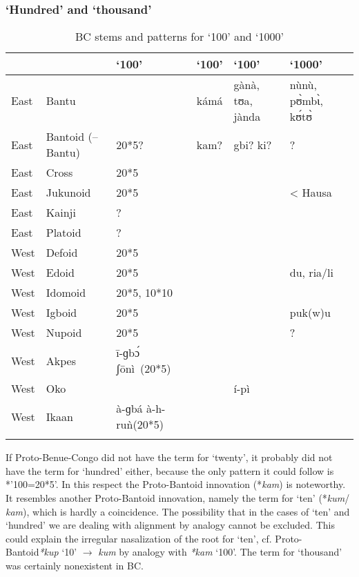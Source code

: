 \clearpage
\subsubsection{‘Hundred’ and ‘thousand’}\label{sec:3.1.4.10}
\begin{table}
\caption{\label{tab:3:63}BC stems and patterns for `100'  and `1000'}


\begin{tabularx}{\textwidth}{lQ QllQ}
\lsptoprule

~ & \textbf{~} & `100' & `100' & `100' & `1000' \\
\midrule
East & {Bantu} &   & kámá & gànà, tʊa, jànda & n{\`{u}}n{\`{u}}, p{\`{ʊ}}mb{\`{ɩ}}, k{\'{ʊ}}t{\`{ʊ}}\\
East & {Bantoid} {(–Bantu)} & 20*5? & kam? & gbi? ki? &?\\
East & {Cross} & 20*5 &   &   &  \\
East & {Jukunoid} & 20*5 &   &   & < Hausa\\
East & {Kainji} & ? &   &   &  \\
East & {Platoid} & ? &   &   &  \\
West & {Defoid} & 20*5 &   &   &  \\
West & {Edoid} & 20*5 &   &   & du, ria/li\\
West & {Idomoid} & 20*5, 10*10 &   &   &  \\
West & {Igboid} & 20*5 &   &   & puk(w)u\\
West & {Nupoid} & 20*5 &   &   & ?\\
West & {Akpes} & {\={i}}-ɡb{\'{ɔ}} ʃ{\={o}}nì~(20*5) &   &   &  \\
West & {Oko} &   &   & í-pì &  \\
West & {Ikaan} & à-ɡbá à-h-ruǹ(20*5) &   &   &  \\
\lspbottomrule
\end{tabularx}
\end{table}

If Proto-Benue-Congo did not have the term for ‘twenty’, it probably did not have the term for ‘hundred’ either, because the only pattern it could follow is *’100=20*5’. In this respect the Proto-Bantoid innovation (*\textit{kam}) is noteworthy. It resembles another Proto-Bantoid innovation, namely the term for ‘ten’ (*\textit{kum}/ \textit{kam}), which is hardly a coincidence. The possibility that in the cases of ‘ten’ and ‘hundred’ we are dealing with alignment by analogy cannot be excluded. This could explain the irregular nasalization of the root for ‘ten’, cf. Proto-Bantoid\textit{*kup} ‘10’ ${\rightarrow}$ \textit{kum} by analogy with \textit{*kam} ‘100’.
The term for ‘thousand’ was certainly nonexistent in BC.

